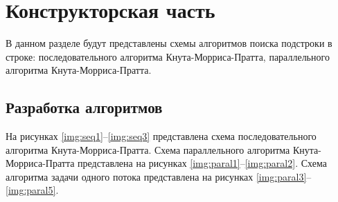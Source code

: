 \chapter{Конструкторская часть}

В данном разделе будут представлены схемы алгоритмов поиска подстроки в строке: последовательного алгоритма Кнута-Морриса-Пратта, параллельного алгоритма Кнута-Морриса-Пратта.

\section{Разработка алгоритмов}

На рисунках \ref{img:seq1}--\ref{img:seq3}  представлена схема последовательного алгоритма Кнута-Морриса-Пратта. Схема параллельного алгоритма Кнута-Морриса-Пратта представлена на рисунках \ref{img:paral1}--\ref{img:paral2}. Схема алгоритма задачи одного потока представлена на рисунках \ref{img:paral3}--\ref{img:paral5}.
\clearpage
{}
\clearpage
